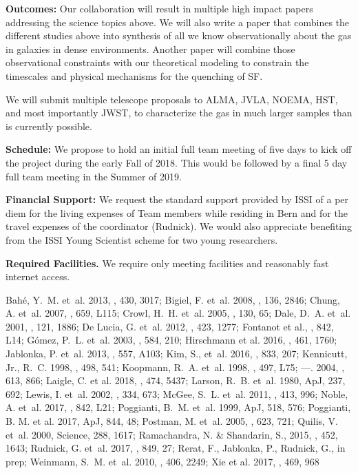 \documentclass[11pt]{article}
\begin{document}
\textbf{Outcomes:} Our collaboration will result in multiple high impact papers addressing the science topics above.  We will also write a paper that combines the different studies above into synthesis of all we know observationally about the gas in galaxies in
dense environments.  Another paper will combine those observational
constraints with our theoretical modeling to constrain the timescales
and physical mechanisms for the quenching of SF.

We will submit multiple telescope proposals to ALMA, JVLA, NOEMA, HST, and most importantly JWST, 
 to characterize the gas in much larger samples than is currently possible.

\textbf{Schedule:} We propose to hold an initial full team meeting of five days to kick off the project during the early Fall of 2018. This would be followed by a final 5 day full team meeting in the Summer of 2019. 

\textbf{Financial Support:} We request the standard support provided
by ISSI of a per diem for the living expenses of Team members while
residing in Bern and for the travel expenses of the coordinator
(Rudnick). We would also appreciate benefiting from the ISSI Young
Scientist scheme for two young researchers.  

\textbf{Required Facilities.}  We require only meeting facilities and
reasonably fast internet access.

\footnotesize{{Bah\'e}, Y.~M. {et~al.} 2013, \mnras, 430, 3017; 
{Bigiel}, F. {et~al.} 2008, \aj, 136, 2846; 
{Chung}, A. {et~al.} 2007, \apjl, 659, L115; 
{Crowl}, H.~H. {et~al.} 2005, \aj, 130, 65; 
{Dale}, D.~A. {et~al.} 2001, \aj, 121, 1886; 
{De Lucia}, G. {et~al.} 2012, \mnras, 423, 1277; 
Fontanot et al., \mnras, 842, L14;
{G{\' o}mez}, P.~L. {et~al.} 2003, \apj, 584, 210; 
Hirschmann et al. 2016, \mnras, 461, 1760;
{Jablonka}, P. {et~al.} 2013, \aap, 557, A103; 
{Kim}, S., et~al. 2016, \apj, 833, 207;
{Kennicutt}, Jr., R.~C. 1998, \apj, 498, 541; 
{Koopmann}, R.~A. {et~al.} 1998, \apjl, 497, L75; 
---. 2004, \apj, 613, 866; 
Laigle, C. et al. 2018, \mnras, 474, 5437;
{Larson}, R.~B. {et~al.} 1980, ApJ, 237, 692; 
{Lewis}, I. {et~al.} 2002, \mnras, 334, 673; 
{McGee}, S.~L. {et~al.} 2011, \mnras, 413, 996; 
Noble, A. et~al. 2017, \apj, 842, L21;
{Poggianti}, B.~M. {et~al.} 1999, ApJ, 518, 576; 
Poggianti, B. M. et al. 2017, ApJ, 844, 48;
{Postman}, M. {et~al.} 2005, \apj, 623, 721; 
{Quilis}, V. {et~al.} 2000, Science, 288, 1617; 
{Ramachandra}, N. \& {Shandarin}, S., 2015, \mnras, 452, 1643;
Rudnick, G. et~al. 2017, \apj, 849, 27;
{Rerat}, F., Jablonka, P., Rudnick, G., in prep;
{Weinmann}, S.~M. {et~al.} 2010, \mnras, 406, 2249};
Xie et al. 2017, \mnras, 469, 968
\end{document}
